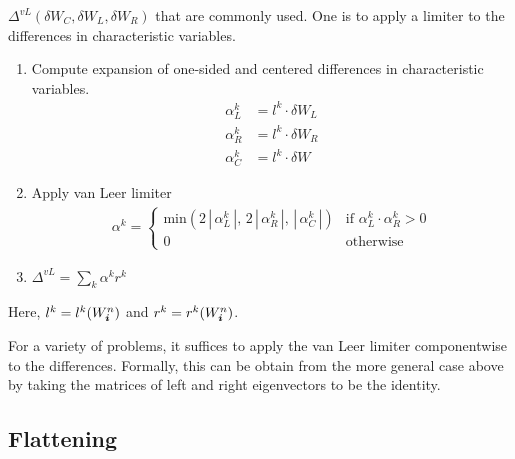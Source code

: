 $\Delta^{vL}(\delta W_C, \delta W_L, \delta W_R)$ that are commonly used. 
One is to apply a limiter to the differences in characteristic
variables.
\begin{enumerate}

\item Compute expansion of one-sided and centered differences in
characteristic variables.
\begin{align}
\alpha^k_L &= l^k \cdot \delta W_L \\
\alpha^k_R &= l^k \cdot \delta W_R \\
\alpha^k_C   &= l^k \cdot \delta W
\end{align}

\item Apply van Leer limiter
\begin{align}
\alpha^k =
  \begin{cases}
  \text{min}(2 \, | \, \alpha^k_L \, |, \,
      2 \, | \, \alpha^k_R \, |, \,
           | \, \alpha^k_C \, |) &
    \text{if $\alpha^k_L \cdot \alpha^k_R > 0$}
  \\
  0 &
    \text{otherwise}
  \end{cases}
\end{align}

\item $\Delta^{vL} = \sum_k \alpha^k r^k$
\end{enumerate}

\noindent
Here, $l^k= l^k(W^n_{\boldsymbol{i}})$ and $r^k = r^k(W^n_{\boldsymbol{i}})$.

For a variety of problems, it suffices to apply the van Leer limiter 
componentwise to the differences. Formally,
this can be obtain from the more general
case above by taking the matrices of left and right eigenvectors to be
the identity.

\subsection{Flattening}

